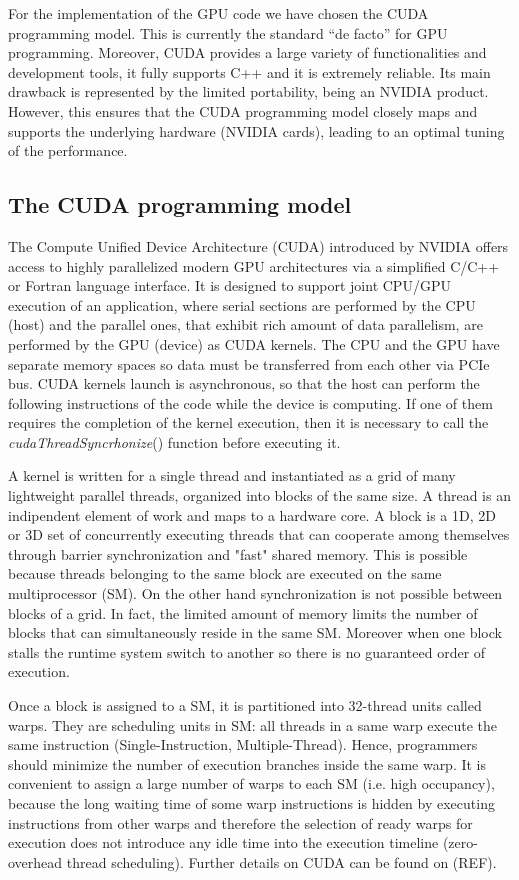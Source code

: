 \documentclass[11pt]{article}
\begin{document}
For the implementation of the GPU code we have chosen the CUDA programming
model. This is currently the standard ``de facto'' for GPU programming.
Moreover, CUDA provides a large variety of functionalities and
development tools, it fully supports C++ and it is extremely reliable. Its main drawback is
represented by the limited portability, being an NVIDIA product. However, 
this ensures that the CUDA programming model closely maps and supports the underlying 
hardware (NVIDIA cards), leading to an optimal tuning of the performance.  

\subsection{The CUDA programming model}

The Compute Unified Device Architecture (CUDA) introduced by NVIDIA offers access to highly parallelized modern GPU architectures via a simplified C/C++ or Fortran language interface. It is designed to support joint CPU/GPU execution of an application, where serial sections are performed by the CPU (host) and the parallel ones, that exhibit rich amount of data parallelism, are performed by the GPU (device) as CUDA kernels. The CPU and the GPU have separate memory spaces so data must be transferred from each other via PCIe bus. CUDA kernels launch is asynchronous, so that the host can perform the following instructions of the code while the device is computing. If one of them requires the completion of the kernel execution, then it is necessary to call the \textit{cudaThreadSyncrhonize}() function before executing it. 

A kernel is written for a single thread and instantiated as a grid of many lightweight parallel threads, organized into blocks of the same size. 
A thread is an indipendent element of work and maps to a hardware core. A block is a 1D, 2D or 3D set of concurrently executing threads that can cooperate among themselves through barrier synchronization and "fast" shared memory. This is possible because threads belonging to the same block are executed on the same multiprocessor (SM). On the other hand synchronization is not possible between blocks of a grid. In fact, the limited amount of memory limits the number of blocks that can simultaneously reside in the same SM. Moreover when one block stalls the runtime system switch to another so there is no guaranteed order of execution.

Once a block is assigned to a SM, it is partitioned into 32-thread units called warps. They are scheduling units in SM:
all threads in a same warp execute the same instruction (Single-Instruction, Multiple-Thread). Hence, programmers should minimize the number of execution branches inside the same warp. It is convenient to assign a large number of warps to each SM (i.e. high occupancy), because the long waiting time of some warp instructions is hidden by executing instructions from other warps  and therefore the selection of ready warps for execution does not introduce any idle time into the execution timeline (zero-overhead thread scheduling). Further details on CUDA can be found on (REF).
\end{document}
